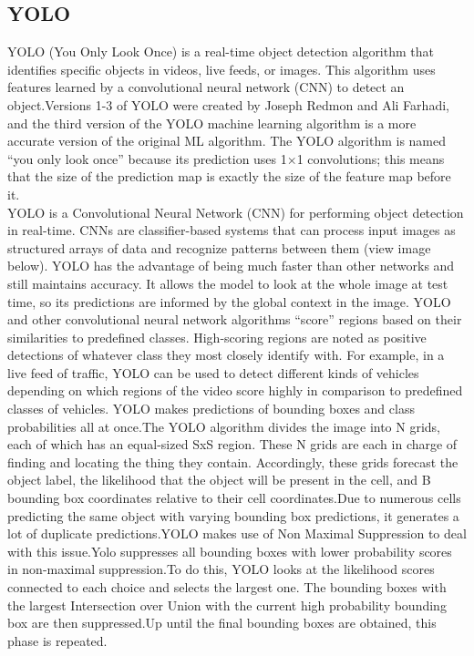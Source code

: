 \subsection*{YOLO}
YOLO (You Only Look Once) is a real-time object detection algorithm that identifies specific objects in videos, live feeds, or images. This algorithm uses features learned by a convolutional neural network (CNN) to detect an object.Versions 1-3 of YOLO were created by Joseph Redmon and Ali Farhadi, and the third version of the YOLO machine learning algorithm is a more accurate version of the original ML algorithm.
The YOLO algorithm is named “you only look once” because its prediction uses 1×1 convolutions; this means that the size of the prediction map is exactly the size of the feature map before it.  
\\
YOLO is a Convolutional Neural Network (CNN) for performing object detection in real-time. CNNs are classifier-based systems that can process input images as structured arrays of data and recognize patterns between them (view image below). YOLO has the advantage of being much faster than other networks and still maintains accuracy.
It allows the model to look at the whole image at test time, so its predictions are informed by the global context in the image. YOLO and other convolutional neural network algorithms “score” regions based on their similarities to predefined classes. High-scoring regions are noted as positive detections of whatever class they most closely identify with. For example, in a live feed of traffic, YOLO can be used to detect different kinds of vehicles depending on which regions of the video score highly in comparison to predefined classes of vehicles.
YOLO makes predictions of bounding boxes and class probabilities all at once.The YOLO algorithm divides the image into N grids, each of which has an equal-sized SxS region. These N grids are each in charge of finding and locating the thing they contain.
Accordingly, these grids forecast the object label, the likelihood that the object will be present in the cell, and B bounding box coordinates relative to their cell coordinates.Due to numerous cells predicting the same object with varying bounding box predictions, it generates a lot of duplicate predictions.YOLO makes use of Non Maximal Suppression to deal with this issue.Yolo suppresses all bounding boxes with lower probability scores in non-maximal suppression.To do this, YOLO looks at the likelihood scores connected to each choice and selects the largest one. The bounding boxes with the largest Intersection over Union with the current high probability bounding box are then suppressed.Up until the final bounding boxes are obtained, this phase is repeated.

